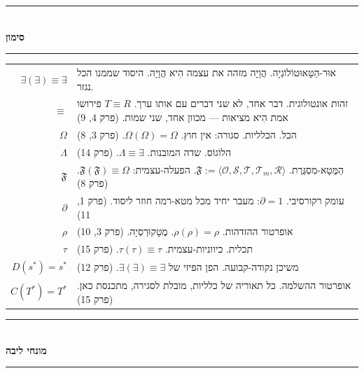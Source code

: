 \documentclass[10pt, openany, oneside]{book}
\renewcommand{\normalsize}{\fontsize{10}{13}\selectfont}
\renewcommand{\footnotesize}{\fontsize{8.5}{11}\selectfont}
\begin{document}

\begin{center}
    \rule{0.3\textwidth}{0.4pt}\\[0.5em]
    {\normalsize\bfseries\textsc{סימון}}\\[0.3em]
    \rule{0.3\textwidth}{0.4pt}
\end{center}

\vspace{1em}

{\footnotesize
\noindent\begin{tabular}{@{} r @{\hspace{0.6em}} p{} @{}}
$\exists(\exists) \equiv \exists$ & אוּר-הַטָּאוּטוֹלוֹגְיָה. הֲוָיָה מזהה את עצמה הִיא הֲוָיָה. היסוד שממנו הכל נגזר. \\[0.3em]
$\equiv$ & זהות אונטולוגית. דבר אחד, לא שני דברים עם אותו ערך. $T \equiv R$ פירושו אמת הִיא מציאות — מכוון אחד, שני שמות. (פרק 4, 9) \\[0.3em]
$\Omega$ & הכל. הכלליות. סגורה: אין חוץ. $\Omega(\Omega) = \Omega$. (פרק 3, 8) \\[0.3em]
$\Lambda$ & הלוֹגוֹס. שדה המובנות. $\Lambda \equiv \exists$. (פרק 14) \\[0.3em]
$\mathfrak{F}$ & הַמֶּטָא-מִסְגֶּרֶת. $\mathfrak{F} := \langle \mathcal{O}, \mathcal{S}, \mathcal{T}, \mathcal{T}_m, \mathcal{R} \rangle$. הפעלה-עצמית: $\mathfrak{F}(\mathfrak{F}) \equiv \Omega$. (פרק 8) \\[0.3em]
$\partial$ & עומק רקורסיבי. $\partial = 1$: מעבר יחיד מכל מטא-רמה חוזר ליסוד. (פרק 1, 11) \\[0.3em]
$\rho$ & אופרטור ההזדהות. $\rho(\rho) = \rho$. מֶטָקוּרְסְיָה. (פרק 3, 10) \\[0.3em]
$\tau$ & תכלית. כיווניות-עצמית. $\tau(\tau) \equiv \tau$. (פרק 15) \\[0.3em]
$D(s^*)=s^*$ & משיכן נקודה-קבועה. הפן הפיזי של $\exists(\exists) \equiv \exists$. (פרק 12) \\[0.3em]
$C(T^*)=T^*$ & אופרטור ההשלמה. כל תאוריה של כלליות, מובלת לסגירה, מתכנסת כאן. (פרק 15) \\[0.3em]
\end{tabular}
}

\vspace{1.5em}


\begin{center}
    \rule{0.3\textwidth}{0.4pt}\\[0.5em]
    {\normalsize\bfseries\textsc{מונחי ליבה}}\\[0.3em]
    \rule{0.3\textwidth}{0.4pt}
\end{center}
\end{document}
